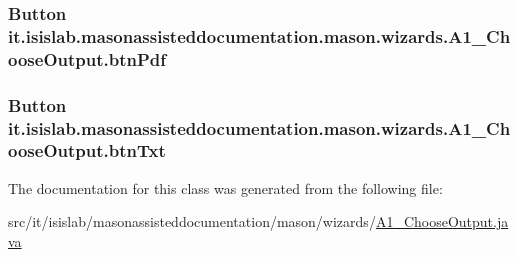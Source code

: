 \hypertarget{classit_1_1isislab_1_1masonassisteddocumentation_1_1mason_1_1wizards_1_1_a1___choose_output_a9b810d24e36dd0e722f76a0f0a9b064b}{
\subsubsection[{btn\-Pdf}]{\setlength{\rightskip}{0pt plus 5cm}Button it.\-isislab.\-masonassisteddocumentation.\-mason.\-wizards.\-A1\-\_\-\-Choose\-Output.\-btn\-Pdf\hspace{0.3cm}{\ttfamily [package]}}}\label{classit_1_1isislab_1_1masonassisteddocumentation_1_1mason_1_1wizards_1_1_a1___choose_output_a9b810d24e36dd0e722f76a0f0a9b064b}
\hypertarget{classit_1_1isislab_1_1masonassisteddocumentation_1_1mason_1_1wizards_1_1_a1___choose_output_a7a3e59d93bfba5d422c70ffdaf34f8ae}{
\subsubsection[{btn\-Txt}]{\setlength{\rightskip}{0pt plus 5cm}Button it.\-isislab.\-masonassisteddocumentation.\-mason.\-wizards.\-A1\-\_\-\-Choose\-Output.\-btn\-Txt\hspace{0.3cm}{\ttfamily [package]}}}\label{classit_1_1isislab_1_1masonassisteddocumentation_1_1mason_1_1wizards_1_1_a1___choose_output_a7a3e59d93bfba5d422c70ffdaf34f8ae}


The documentation for this class was generated from the following file\-:\begin{DoxyCompactItemize}
\item 
src/it/isislab/masonassisteddocumentation/mason/wizards/\hyperlink{_a1___choose_output_8java}{A1\-\_\-\-Choose\-Output.\-java}\end{DoxyCompactItemize}
